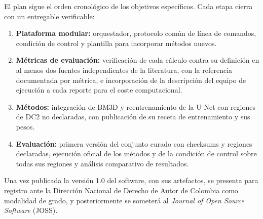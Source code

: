 El plan sigue el orden cronol\'ogico de los objetivos espec\'ificos. Cada etapa cierra con un entregable verificable:

\begin{enumerate}
  \item \textbf{Plataforma modular:} orquestador, protocolo com\'un de l\'inea de comandos, condici\'on de control y plantilla para incorporar m\'etodos nuevos.
  \item \textbf{M\'etricas de evaluaci\'on:} verificaci\'on de cada c\'alculo contra su definici\'on en al menos dos fuentes independientes de la literatura, con la referencia documentada por m\'etrica, e incorporaci\'on de la descripci\'on del equipo de ejecuci\'on a cada reporte para el coste computacional.
  \item \textbf{M\'etodos:} integraci\'on de BM3D y reentrenamiento de la U-Net con regiones de DC2 no declaradas, con publicaci\'on de su receta de entrenamiento y sus pesos.
  \item \textbf{Evaluaci\'on:} primera versi\'on del conjunto curado con checksums y regiones declaradas, ejecuci\'on oficial de los m\'etodos y de la condici\'on de control sobre todas sus regiones y an\'alisis comparativo de resultados.
\end{enumerate}

Una vez publicada la versi\'on 1.0 del software, con sus artefactos, se presenta para registro ante la Direcci\'on Nacional de Derecho de Autor de Colombia como modalidad de grado, y posteriormente se someter\'a al \textit{Journal of Open Source Software} (JOSS).
